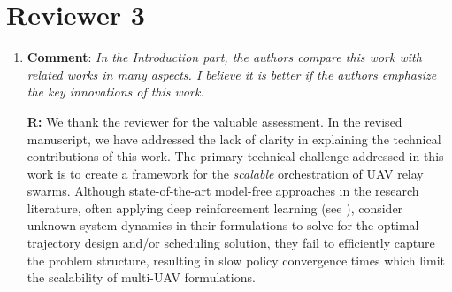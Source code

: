 \documentclass[12pt, draftcls, onecolumn]{IEEEtran}
\theoremstyle{plain}
\theoremstyle{definition}
\theoremstyle{remark}
\begin{document}
\section*{Reviewer 3}
\begin{enumerate}
    \item \textbf{Comment}: \emph{In the Introduction part, the authors compare this work with related works in many aspects. I believe it is better if the authors emphasize the key innovations of this work.}
    
    \textbf{R:} We thank the reviewer for the valuable assessment. In the revised manuscript, we have addressed the lack of clarity in explaining the technical contributions of this work. The primary technical challenge addressed in this work is to create a framework for the \emph{scalable} orchestration of UAV relay swarms. Although state-of-the-art model-free approaches in the research literature, often applying deep reinforcement learning (see \cite{DDQN, MEC-DDPG, DQNPositioning, MLDeployment}), consider unknown system dynamics in their formulations to solve for the optimal trajectory design and/or scheduling solution, they fail to efficiently capture the problem structure, resulting in slow policy convergence times which limit the scalability of multi-UAV formulations.
    \vspace{2mm}
    

\end{enumerate}
\end{document}
